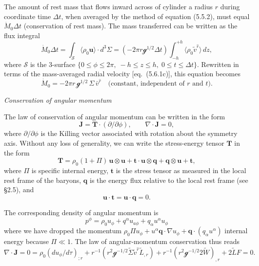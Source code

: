 \medskip
The amount of rest mass that flows inward across of cylinder a radius $r$ during
coordinate time $\Delta t$, when averaged by the method of equation (5.5.2), must
equal $\dot{M}_0 \Delta t$ (conservation of rest mass).  The mass transferred can be written
as the flux integral
\begin{equation}
\dot{M}_0 \Delta t = \int_{\mathscr{S}} \langle \rho_0 \mathbf{u} \rangle \cdot d^3\Sigma
= (-2\pi r \mathscr{g}^{1/2} \Delta t)
\int_{-h}^{+h} \langle \rho_0 \tilde{v}^{\hat{r}} \rangle\, dz,
\tag{5.6.2}
\end{equation}
where $\mathscr{S}$ is the 3-surface $\{0 \leq \phi \leq 2\pi,\; -h \leq z \leq h,\; 0 \leq t \leq \Delta t\}$.
Rewritten in terms of the mass-averaged radial velocity [eq.\ (5.6.1c)], this equation becomes
\begin{equation}
\dot{M}_0 = -2\pi r\, \mathscr{g}^{1/2}\, \Sigma\, \bar{v}^{\hat{r}}
\quad \text{(constant, independent of $r$ and $t$)}.
\tag{5.6.2}
\end{equation}

\bigskip
\noindent\textit{Conservation of angular momentum}

\medskip
The law of conservation of angular momentum can be written in the form
\begin{equation}
\mathbf{J} = \mathbf{T} \cdot (\partial/\partial\phi),
\qquad \nabla \cdot \mathbf{J} = 0,
\tag{5.6.3}
\end{equation}
where $\partial/\partial\phi$ is the Killing vector associated with rotation about the symmetry
axis.  Without any loss of generality, we can write the stress-energy tensor $\mathbf{T}$ in
the form
\begin{equation}
\mathbf{T} = \rho_0 (1+\Pi)\,\mathbf{u} \otimes \mathbf{u}
+ \mathbf{t} \cdot \mathbf{u} \otimes \mathbf{q}
+ \mathbf{q} \otimes \mathbf{u} + \mathbf{t},
\tag{5.6.4a}
\end{equation}
where $\Pi$ is specific internal energy, $\mathbf{t}$ is the stress tensor as measured in the local
rest frame of the baryons, $\mathbf{q}$ is the energy flux relative to the local rest frame
(see \S2.5), and
\begin{equation}
\mathbf{u} \cdot \mathbf{t} = \mathbf{u} \cdot \mathbf{q} = 0.
\tag{5.6.4b}
\end{equation}

The corresponding density of angular momentum is
\begin{equation}
p^\phi = \rho_0 u_\phi + q^\alpha u_{a\phi} + q_\alpha u^\alpha u_\phi
\tag{5.6.5}
\end{equation}
where we have dropped the momentum $\rho_0\Pi u_\phi + u^\alpha \mathbf{q} \cdot \nabla u_\phi + \mathbf{q} \cdot (q_\alpha u^\alpha)$
internal energy because $\Pi \ll 1$.  The law of angular-momentum conservation thus
reads
\begin{equation}
\nabla \cdot \mathbf{J} = 0 = \rho_0 (du_\phi/d\tau)_{;r} + r^{-1}(r^2 \mathscr{g}^{-1/2} \tilde{\Sigma} \tilde{v}^{\hat{r}} \tilde{L}_{,r})
+ r^{-1}(r^2 \mathscr{g}^{-1/2} 2\tilde{W})_{,r} + 2\tilde{L}F = 0.
\end{equation}

